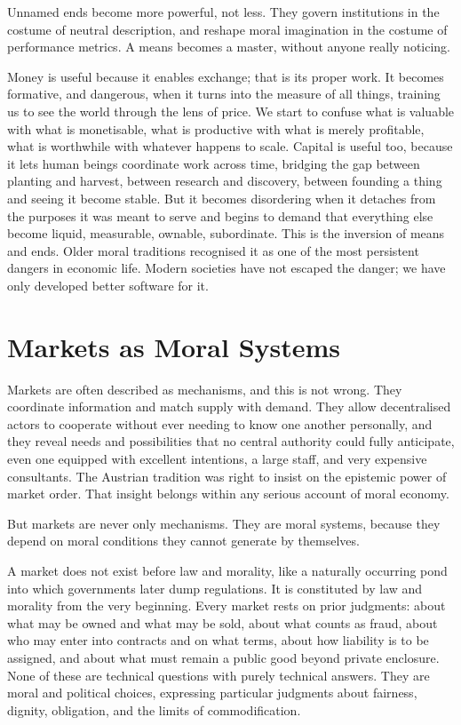 \documentclass[11pt,a4paper,oneside]{book}
\begin{document}
Unnamed ends become more powerful, not less. They govern institutions in the costume of neutral description, and reshape moral imagination in the costume of performance metrics. A means becomes a master, without anyone really noticing.

Money is useful because it enables exchange; that is its proper work. It becomes formative, and dangerous, when it turns into the measure of all things, training us to see the world through the lens of price. We start to confuse what is valuable with what is monetisable, what is productive with what is merely profitable, what is worthwhile with whatever happens to scale. Capital is useful too, because it lets human beings coordinate work across time, bridging the gap between planting and harvest, between research and discovery, between founding a thing and seeing it become stable. But it becomes disordering when it detaches from the purposes it was meant to serve and begins to demand that everything else become liquid, measurable, ownable, subordinate. This is the inversion of means and ends. Older moral traditions recognised it as one of the most persistent dangers in economic life. Modern societies have not escaped the danger; we have only developed better software for it.

\section*{Markets as Moral Systems}

Markets are often described as mechanisms, and this is not wrong. They coordinate information and match supply with demand. They allow decentralised actors to cooperate without ever needing to know one another personally, and they reveal needs and possibilities that no central authority could fully anticipate, even one equipped with excellent intentions, a large staff, and very expensive consultants. The Austrian tradition was right to insist on the epistemic power of market order. That insight belongs within any serious account of moral economy.

But markets are never only mechanisms. They are moral systems, because they depend on moral conditions they cannot generate by themselves.

A market does not exist before law and morality, like a naturally occurring pond into which governments later dump regulations. It is constituted by law and morality from the very beginning. Every market rests on prior judgments: about what may be owned and what may be sold, about what counts as fraud, about who may enter into contracts and on what terms, about how liability is to be assigned, and about what must remain a public good beyond private enclosure. None of these are technical questions with purely technical answers. They are moral and political choices, expressing particular judgments about fairness, dignity, obligation, and the limits of commodification.
\end{document}
